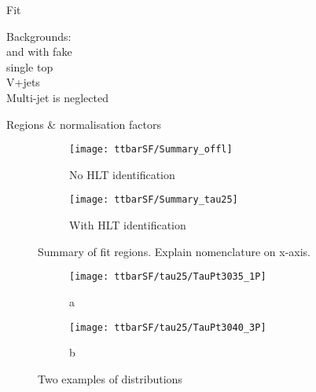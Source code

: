 

Fit \mTW

Backgrounds:\\
\ttbar and \ttbar with fake \tauhad\\
single top \\
V+jets \\
Multi-jet is neglected

Regions \& normalisation factors


\begin{figure}[htbp]
  \centering

  \begin{subfigure}{.5\textwidth}
    \texttt{[image: ttbarSF/Summary\_offl]}
    \caption{No HLT identification}
  \end{subfigure}%
  \begin{subfigure}{.5\textwidth}
    \texttt{[image: ttbarSF/Summary\_tau25]}
    \caption{With HLT identification}
  \end{subfigure}

  \caption{Summary of fit regions. Explain nomenclature on x-axis.}
\end{figure}


\begin{figure}[htbp]
  \centering

  \begin{subfigure}{.5\textwidth}
    \texttt{[image: ttbarSF/tau25/TauPt3035\_1P]}
    \caption{a}
  \end{subfigure}%
  \begin{subfigure}{.5\textwidth}
    \texttt{[image: ttbarSF/tau25/TauPt3040\_3P]}
    \caption{b}
  \end{subfigure}

  \caption{Two examples of \mTW distributions}
\end{figure}




